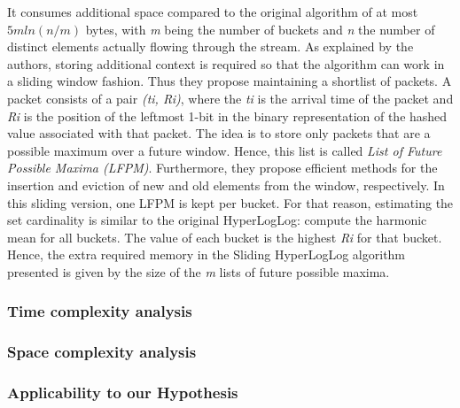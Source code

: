 It consumes additional space compared to the original algorithm of at most $5\textit{m}ln(\textit{n}/\textit{m})$ bytes, with \textit{m} being the number of buckets and \textit{n} the number of distinct elements actually flowing through the stream. As explained by the authors, storing additional context is required so that the algorithm can work in a sliding window fashion. Thus they propose maintaining a shortlist of packets. A packet consists of a pair \textit{(ti, Ri)}, where the \textit{ti} is the arrival time of the packet and \textit{Ri} is the position of the leftmost 1-bit in the binary representation of the hashed value associated with that packet. The idea is to store only packets that are a possible maximum over a future window. Hence, this list is called \textit{List of Future Possible Maxima (LFPM)}. Furthermore, they propose efficient methods for the insertion and eviction of new and old elements from the window, respectively. In this sliding version, one LFPM is kept per bucket. For that reason, estimating the set cardinality is similar to the original HyperLogLog: compute the harmonic mean for all buckets. The value of each bucket is the highest \textit{Ri} for that bucket. Hence, the extra required memory in the Sliding HyperLogLog algorithm presented is given by the size of the \textit{m} lists of future possible maxima.

\subsubsection*{Time complexity analysis}
\subsubsection*{Space complexity analysis}
\subsubsection*{Applicability to our Hypothesis}
